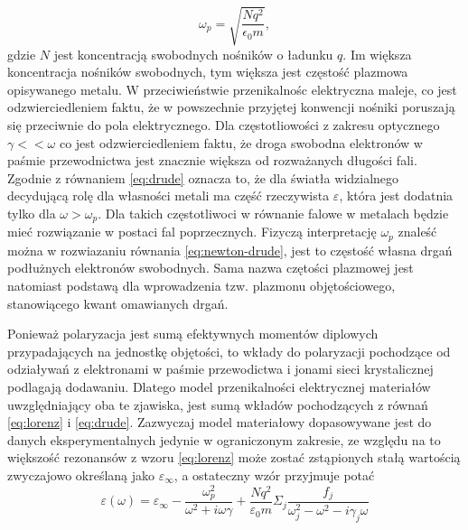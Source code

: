 \begin{equation}
\omega_p = \sqrt{\frac{N q^2}{\epsilon_0 m}},
\label{eq:omega-plazmowa}
\end{equation}
gdzie $N$ jest koncentracją swobodnych nośników o ładunku $q$. Im większa koncentracja nośników swobodnych, tym większa jest częstość plazmowa opisywanego metalu. W przeciwieństwie przenikalnośc elektryczna maleje, co jest odzwierciedleniem faktu, że w powszechnie przyjętej konwencji nośniki poruszają się przeciwnie do pola elektrycznego. Dla częstotliowości z zakresu optycznego $\gamma<<\omega$ co jest odzwierciedleniem faktu, że droga swobodna elektronów w paśmie przewodnictwa jest znacznie większa od rozważanych długości fali. Zgodnie z równaniem  \ref{eq:drude} oznacza to, że dla światła widzialnego decydującą rolę dla własności metali ma część rzeczywista $\varepsilon$, która jest dodatnia tylko dla $\omega>\omega_p$. Dla takich częstotliwoci w równanie falowe w metalach będzie mieć rozwiązanie w postaci fal poprzecznych. Fizyczą interpretację $\omega_p$ znaleść można w rozwiazaniu równania \ref{eq:newton-drude}, jest to częstość własna drgań podłużnych elektronów swobodnych. Sama nazwa czętości plazmowej jest natomiast podstawą dla wprowadzenia tzw. plazmonu objętościowego, stanowiącego kwant omawianych drgań.

Ponieważ polaryzacja jest sumą efektywnych momentów diplowych przypadających na jednostkę objętości, to wkłady do polaryzacji pochodzące od odziaływań z elektronami w paśmie przewodictwa i jonami sieci krystalicznej podlagają dodawaniu. Dlatego model przenikalności elektrycznej materiałów uwzględniający oba te zjawiska, jest sumą wkładów pochodzących z równań \ref{eq:lorenz} i \ref{eq:drude}. Zazwyczaj model materiałowy dopasowywane jest do danych eksperymentalnych jedynie w ograniczonym zakresie, ze względu na to większość rezonansów z wzoru \ref{eq:lorenz} może zostać zstąpionych stałą wartością zwyczajowo określaną jako $\varepsilon_\infty$, a ostateczny wzór przyjmuje potać
\begin{equation}
\varepsilon(\omega)=\varepsilon_\infty- \frac{\omega_p^2}{\omega^2+i\omega\gamma} +\frac{Nq^2}{\varepsilon_0 m} \Sigma_j \frac{f_j}{\omega_j^2-\omega^2-i\gamma_j\omega}
\label{eq:lorenz-drude}
\end{equation}
